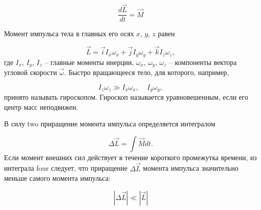 \documentclass[12pt, a4paper]{article}
\begin{document}
\begin{equation}
\frac{d\vec{L}}{dt}=\vec{M}
\label{two}
\end{equation}

Момент импульса тела в главных его осях $x$, $y$, $z$ равен

\begin{equation}
\vec{L} = \vec{i}I_x\omega_x+\vec{j}I_y\omega_y+\vec{k}I_z\omega_z,
\label{three}
\end{equation}
где $ I_x $, $ I_y $, $ I_z $ -- главные моменты инерции, $ \omega_x $, $ \omega_y $, $ \omega_z $ -- компоненты вектора угловой скорости $ \vec{\omega} $. Быстро вращающееся тело, для которого, например,

\begin{equation}
I_z\omega_z \gg I_x\omega_x,\;\;\;\;I_y\omega_y,
\end{equation} 
принято называть гироскопом. Гироскоп называется уравновешенным, если его центр масс неподвижен.

В силу {two} приращение момента импульса определяется интегралом

\begin{equation}
\Delta\vec{L} = \int\vec{M} dt.
\label{four}
\end{equation}
Если момент внешних сил действует в течение короткого промежутка времени, из интеграла {four} следует, что приращение $ \Delta \vec{L} $ момента импульса значительно меньше самого момента импульса:

\begin{equation}
\left|\Delta \vec{L}\right| \ll \left|\vec{L}\right| 
\end{equation}
\end{document}
